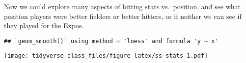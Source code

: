 \documentclass[]{book}
\newenvironment{Shaded}{\begin{snugshade}}{\end{snugshade}}
\newcommand{\KeywordTok}[1]{\textcolor[rgb]{0.13,0.29,0.53}{\textbf{#1}}}
\newcommand{\DataTypeTok}[1]{\textcolor[rgb]{0.13,0.29,0.53}{#1}}
\newcommand{\StringTok}[1]{\textcolor[rgb]{0.31,0.60,0.02}{#1}}
\newcommand{\CommentTok}[1]{\textcolor[rgb]{0.56,0.35,0.01}{\textit{#1}}}
\newcommand{\OperatorTok}[1]{\textcolor[rgb]{0.81,0.36,0.00}{\textbf{#1}}}
\newcommand{\NormalTok}[1]{#1}
\begin{document}
Now we could explore many aspects of hitting stats vs.~position, and see
what position players were better fielders or better hitters, or if
neither we can see if they played for the Expos.

\begin{Shaded}
\end{Shaded}

\begin{verbatim}
## `geom_smooth()` using method = 'loess' and formula 'y ~ x'
\end{verbatim}

\texttt{[image: tidyverse-class\_files/figure-latex/ss-stats-1.pdf]}
\end{document}

